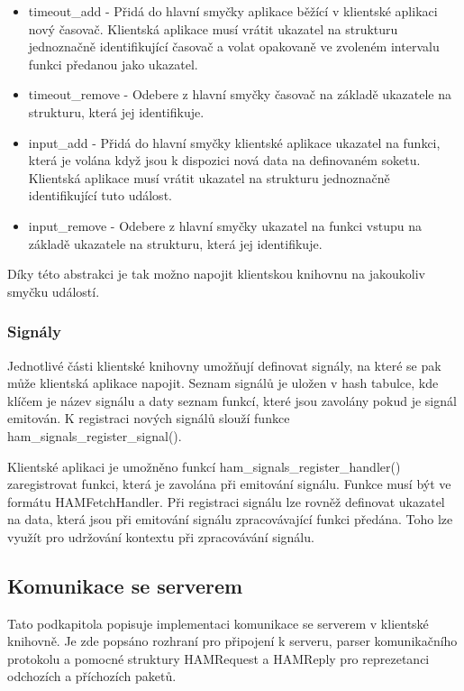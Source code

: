\begin{itemize}
\item timeout\_add - Přidá do hlavní smyčky aplikace běžící v klientské aplikaci
nový časovač. Klientská aplikace
musí vrátit ukazatel na strukturu jednoznačně identifikující časovač a
volat opakovaně ve zvoleném intervalu funkci předanou jako ukazatel.
\item timeout\_remove - Odebere z hlavní smyčky časovač na základě ukazatele na strukturu, která jej identifikuje.
\item input\_add - Přidá do hlavní smyčky klientské aplikace ukazatel na funkci, která je volána když jsou k dispozici
nová data na definovaném soketu. Klientská aplikace
musí vrátit ukazatel na strukturu jednoznačně identifikující tuto událost.
\item input\_remove - Odebere z hlavní smyčky ukazatel na funkci vstupu na
základě ukazatele na strukturu, která jej identifikuje.
\end{itemize}

Díky této abstrakci je tak možno napojit klientskou knihovnu na jakoukoliv smyčku událostí.

\subsubsection{Signály}

Jednotlivé části klientské knihovny umožňují definovat signály, na které se pak může klientská aplikace napojit.
Seznam signálů je uložen v hash tabulce, kde klíčem je název signálu a daty seznam funkcí, které jsou zavolány
pokud je signál emitován. K registraci nových signálů slouží funkce ham\_signals\_register\_signal().

Klientské aplikaci je umožněno funkcí ham\_signals\_register\_handler() zaregistrovat funkci, která je zavolána
při emitování signálu. Funkce musí být ve formátu HAMFetchHandler. Při registraci signálu lze rovněž definovat
ukazatel na data, která jsou při emitování signálu zpracovávající funkci předána. Toho lze využít pro udržování
kontextu při zpracovávání signálu.


\subsection{Komunikace se serverem}

Tato podkapitola popisuje implementaci komunikace se serverem v klientské knihovně. Je zde popsáno rozhraní pro
připojení k serveru, parser komunikačního protokolu a pomocné struktury HAMRequest a HAMReply pro reprezetanci odchozích a
příchozích paketů.

